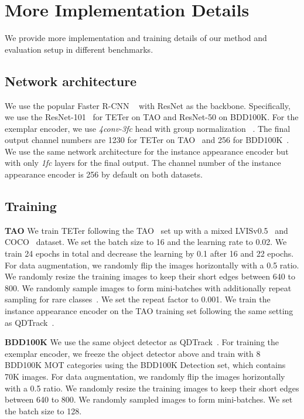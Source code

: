 \documentclass[runningheads]{llncs}
\newcommand{\parsection}[1]{\vspace{1mm}\noindent\textbf{#1 }}
\begin{document}
\section{More Implementation Details}
We provide more implementation and training details of our method and evaluation setup in different benchmarks.

\subsection{Network architecture}
We use the popular Faster R-CNN ~\cite{ren2015faster} with ResNet as the backbone. Specifically, we use the ResNet-101~\cite{he2016deep} for TETer on TAO and ResNet-50 on BDD100K. For the exemplar encoder, we use \textit{4conv-3fc} head with group normalization ~\cite{wu2018group}. The final output channel numbers are 1230 for TETer on TAO~\cite{tao} and 256 for BDD100K~\cite{bdd100k}. We use the same network architecture for the instance appearance encoder but with only \textit{1fc} layers for the final output. The channel number of the instance appearance encoder is 256 by default on both datasets.

\subsection{Training}
\parsection{TAO}
We train TETer following the TAO~\cite{dave2020tao} set up with a mixed LVISv0.5~\cite{lvis} and COCO~\cite{coco} dataset. We set the batch size to 16 and the learning rate to 0.02. We train 24 epochs in total and decrease the learning by 0.1 after 16 and 22 epochs. 
For data augmentation, we randomly flip the images horizontally with a 0.5 ratio. We randomly resize the training images to keep their short edges between 640 to 800. We randomly sample images to form mini-batches with additionally repeat sampling for rare classes~\cite{lvis}. We set the repeat factor to 0.001. We train the instance appearance encoder on the TAO training set following the same setting as QDTrack~\cite{qdtrack}.


\parsection{BDD100K}
We use the same object detector as QDTrack~\cite{qdtrack}. For training the exemplar encoder, we freeze the object detector above and train with 8 BDD100K MOT categories using the BDD100K Detection set, which contains 70K images. For data augmentation, we randomly flip the images horizontally with a 0.5 ratio. We randomly resize the training images to keep their short edges between 640 to 800. We randomly sampled images to form mini-batches. We set the batch size to 128. 
\end{document}
